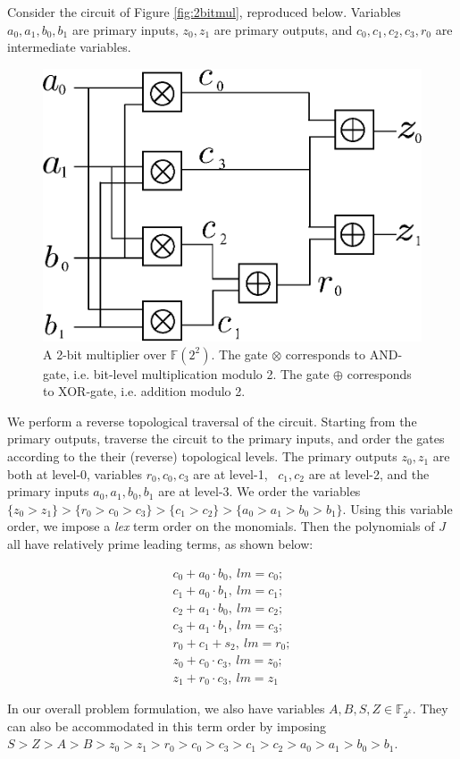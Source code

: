 \begin{Example}
Consider the circuit of Figure \ref{fig:2bitmul}, reproduced
below. Variables $a_0, a_1, b_0, b_1$ are primary inputs,  $z_0, z_1$
are primary outputs, and $c_0, c_1, c_2, c_3, r_0$ are intermediate
variables.   

\begin{figure}[htb]
\centerline{
\includegraphics[scale=0.4]{./figures/2bitmultiplier.eps}
}
\caption{ A 2-bit multiplier over ${\mathbb{F}}(2^2)$. The gate $\otimes$
corresponds to AND-gate, i.e. bit-level multiplication modulo 2. The
gate $\oplus$ corresponds to XOR-gate, i.e. addition modulo 2.}
\label{fig:mul2bit2nd}
\end{figure}

We perform a reverse topological traversal of the
circuit. Starting from the primary outputs, traverse the circuit 
to the primary inputs, and order the gates according to the their
(reverse) topological levels. The primary outputs $z_0,
z_1$ are both at level-0, variables $r_0, c_0, c_3$ are at
level-1, ~$c_1, c_2$ are at level-2, and the primary inputs
$a_0, a_1, b_0, b_1$ are at level-3. We order the variables $\{z_0 >
z_1\} > \{r_0 > c_0 > c_3\} > \{c_1 > c_2\} > \{a_0 > a_1 >  b_0 >
b_1\}$. Using this variable order, we impose a {\it lex} term order on
the monomials. Then the polynomials of $J$ all have relatively prime 
leading terms, as shown below: 

\begin{align*}
c_0+a_0 \cdot b_0, \ lm=c_0;  \nonumber \\
c_1+a_0 \cdot b_1, \ lm=c_1;  \nonumber \\
c_2+a_1 \cdot b_0, \ lm=c_2;  \nonumber \\
c_3+a_1 \cdot b_1, \ lm=c_3;  \nonumber \\
r_0+c_1 + s_2 , \ lm=r_0;     \nonumber \\
z_0+c_0 \cdot c_3, \ lm=z_0;  \nonumber \\
z_1+r_0 \cdot c_3, \ lm=z_1   \nonumber
\end{align*}


In our overall problem formulation, we also have variables $A, B, S, Z
\in \mathbb{F}_{2^k}$.  They can also be accommodated in this term
order by imposing $S >Z> A > B > z_0 > z_1 > r_0 > c_0 > c_3 > c_1 >
c_2 > a_0 > a_1 >b_0 > b_1$. 
\end{Example}


